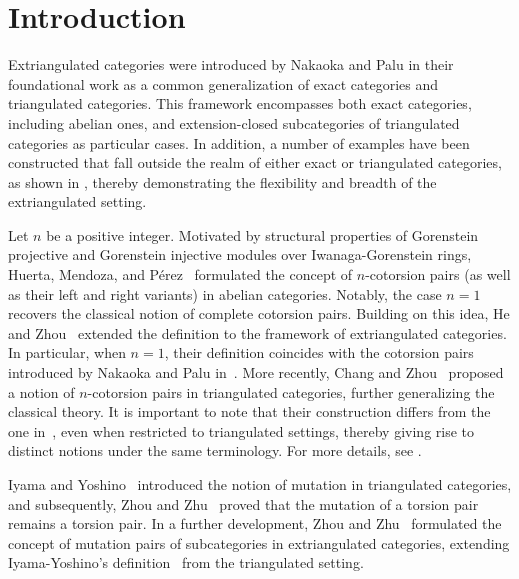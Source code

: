 \documentclass[a4paper,reqno,11pt]{amsart}
\theoremstyle{definition}
\begin{document}
\maketitle



\section{Introduction}
Extriangulated categories were introduced by Nakaoka and Palu in their foundational work \cite{NP} as a common generalization of exact categories and triangulated categories. This framework encompasses both exact categories, including abelian ones, and extension-closed subcategories of triangulated categories as particular cases. In addition, a number of examples have been constructed that fall outside the realm of either exact or triangulated categories, as shown in \cite{NP,ZZ1,ZZ20,HZZ,FHZZ}, thereby demonstrating the flexibility and breadth of the extriangulated setting.


Let $n$ be a positive integer. Motivated by structural properties of Gorenstein projective and Gorenstein injective modules over Iwanaga-Gorenstein rings, Huerta, Mendoza, and P\'{e}rez~\cite[Definition~2.2]{HMP} formulated the concept of $n$-cotorsion pairs (as well as their left and right variants) in abelian categories. Notably, the case $n = 1$ recovers the classical notion of complete cotorsion pairs.
Building on this idea, He and Zhou~\cite{HZ} extended the definition to the framework of extriangulated categories. In particular, when $n = 1$, their definition coincides with the cotorsion pairs introduced by Nakaoka and Palu in~\cite[Definition~4.1]{NP}.
More recently, Chang and Zhou~\cite{CZ} proposed a notion of $n$-cotorsion pairs in triangulated categories, further generalizing the classical theory. It is important to note that their construction differs from the one in~\cite{HZ}, even when restricted to triangulated settings, thereby giving rise to distinct notions under the same terminology.
For more details, see \cite[Remark 3.4 and Example 3.5]{CZ}.


Iyama and Yoshino~\cite{IY} introduced the notion of mutation in triangulated categories, and subsequently, Zhou and Zhu~\cite{ZZ} proved that the mutation of a torsion pair remains a torsion pair. In a further development, Zhou and Zhu~\cite{ZZ1} formulated the concept of mutation pairs of subcategories in extriangulated categories, extending Iyama-Yoshino's definition~\cite[Definition~2.5]{IY} from the triangulated setting.
\end{document}
